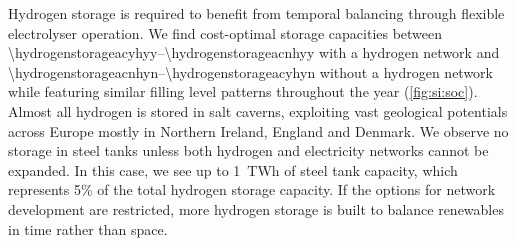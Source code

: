 Hydrogen storage is required to benefit from temporal balancing through flexible
electrolyser operation. We find cost-optimal storage capacities between
\SIrange{\hydrogenstorageacyhyy}{\hydrogenstorageacnhyy}{\twh} with a hydrogen
network and \SIrange{\hydrogenstorageacnhyn}{\hydrogenstorageacyhyn}{\twh}
without a hydrogen network while featuring similar filling level patterns
throughout the year (\cref{fig:si:soc}). Almost all hydrogen is stored in salt
caverns, exploiting vast geological potentials across Europe mostly in Northern
Ireland, England and Denmark. We observe no storage in steel tanks unless both
hydrogen and electricity networks cannot be expanded. In this case, we see up to
1~TWh of steel tank capacity, which represents 5\% of the total hydrogen storage
capacity. If the options for network development are restricted, more hydrogen
storage is built to balance renewables in time rather than space.

